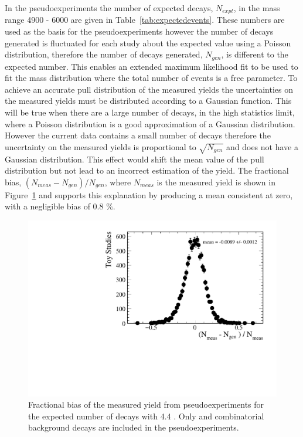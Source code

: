 In the pseudoexperiments the number of expected decays, $N_{expt}$, in the mass range 4900 - 6000 \mevcc are given in Table~\ref{tab:expectedevents}. These numbers are used as the basis for the pseudoexperiments however the number of decays generated is fluctuated for each study about the expected value using a Poisson distribution, therefore the number of decays generated, $N_{gen}$, is different to the expected number. This enables an extended maximum likelihood fit to be used to fit the mass distribution where the total number of events is a free parameter. To achieve an accurate pull distribution of the measured \bsmumu yields the uncertainties on the measured yields must be distributed according to a Gaussian function. This will be true when there are a large number of \bsmumu decays, in the high statistics limit, where a Poisson distribution is a good approximation of a Gaussian distribution. However the current data contains a small number of \bsmumu decays therefore the uncertainty on the measured yields is proportional to $\sqrt{N_{gen}}$ and does not have a Gaussian distribution. This effect would shift the mean value of the pull distribution but not lead to an incorrect estimation of the \bsmumu yield. The fractional bias, $(N_{meas} - N_{gen})/N_{gen}$, where $N_{meas}$ is the measured \bsmumu yield is shown in Figure~\ref{fig:FracBias} and supports this explanation by producing a mean consistent at zero, with a negligible bias of 0.8 $\%$. 

\begin{figure}[htbp]
    \centering
        \includegraphics[width=0.6 \textwidth]{./Figs/LifetimeSystematics/Fractional_bias_Bsmumu_yield_CKM.pdf}
    \caption{Fractional bias of the measured \bsmumu yield from pseudoexperiments for the expected number of decays with 4.4 \fb. Only \bsmumu and combinatorial background decays are included in the pseudoexperiments.}
    \label{fig:FracBias}
\end{figure}


